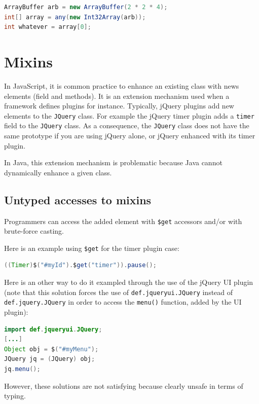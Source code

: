\documentclass[a4paper]{report}
\begin{document}
\begin{lstlisting}[language=Java]
ArrayBuffer arb = new ArrayBuffer(2 * 2 * 4);
int[] array = any(new Int32Array(arb));
int whatever = array[0];
\end{lstlisting}

\section{Mixins}

In JavaScript, it is common practice to enhance an existing class with news elements (field and methods). It is an extension mechanism used when a framework defines plugins for instance. Typically, jQuery plugins add new elements to the \texttt{JQuery} class. For example the jQuery timer plugin adds a \texttt{timer} field to the \texttt{JQuery} class. As a consequence, the \texttt{JQuery} class does not have the same prototype if you are using jQuery alone, or jQuery enhanced with its timer plugin.

In Java, this extension mechanism is problematic because Java cannot dynamically enhance a given class. 

\subsection{Untyped accesses to mixins}

Programmers can access the added element with \texttt{\$get} accessors and/or with brute-force casting. 

Here is an example using \texttt{\$get} for the timer plugin case:

\begin{lstlisting}[language=Java]
((Timer)$("#myId").$get("timer")).pause();
\end{lstlisting}

Here is an other way to do it exampled through the use of the jQuery UI plugin (note that this solution forces the use of \texttt{def.jqueryui.JQuery} instead of \texttt{def.jquery.JQuery} in order to access the \texttt{menu()} function, added by the UI plugin):

\begin{lstlisting}[language=Java]
import def.jqueryui.JQuery;
[...]
Object obj = $("#myMenu");
JQuery jq = (JQuery) obj;
jq.menu();
\end{lstlisting}

However, these solutions are not satisfying because clearly unsafe in terms of typing.
\end{document}
